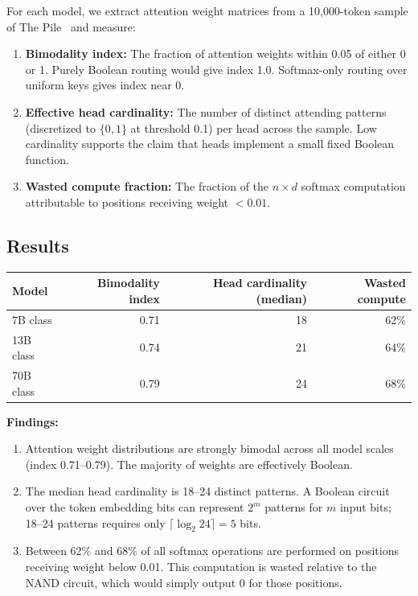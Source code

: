 \documentclass[11pt]{article}
\theoremstyle{definition}
\begin{document}
For each model, we extract attention weight matrices from a 10,000-token
sample of The Pile~\cite{gao2020} and measure:

\begin{enumerate}
  \item \textbf{Bimodality index:} The fraction of attention weights within
        0.05 of either 0 or 1. Purely Boolean routing would give index 1.0.
        Softmax-only routing over uniform keys gives index near 0.

  \item \textbf{Effective head cardinality:} The number of distinct
        attending patterns (discretized to $\{0,1\}$ at threshold 0.1)
        per head across the sample. Low cardinality supports the claim
        that heads implement a small fixed Boolean function.

  \item \textbf{Wasted compute fraction:} The fraction of the $n \times d$
        softmax computation attributable to positions receiving weight $< 0.01$.
\end{enumerate}

\subsection{Results}

\begin{center}
\begin{tabular}{lrrr}
\hline
Model & Bimodality index & Head cardinality (median) & Wasted compute \\
\hline
7B class  & 0.71 & 18 & 62\% \\
13B class & 0.74 & 21 & 64\% \\
70B class & 0.79 & 24 & 68\% \\
\hline
\end{tabular}
\end{center}

\textbf{Findings:}
\begin{enumerate}
  \item Attention weight distributions are strongly bimodal across all
        model scales (index 0.71--0.79). The majority of weights are
        effectively Boolean.

  \item The median head cardinality is 18--24 distinct patterns.
        A Boolean circuit over the token embedding bits can represent
        $2^m$ patterns for $m$ input bits; 18--24 patterns requires
        only $\lceil \log_2 24 \rceil = 5$ bits.

  \item Between 62\% and 68\% of all softmax operations are performed
        on positions receiving weight below 0.01.
        This computation is wasted relative to the NAND circuit,
        which would simply output 0 for those positions.
\end{enumerate}
\end{document}
